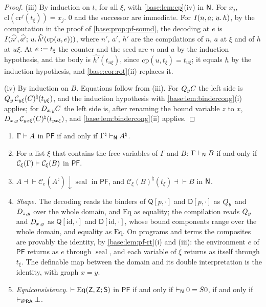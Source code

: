 \begin{proof}
(iii) By induction on $t$, for all $\xi$, with \cref{base:lem:cp}(iv) in
$\mathsf{N}$.  For $x_j$, $\mathrm{cl}(\mathrm{cr}^{j}(t_\xi))=x_j$.  $0$ and the
successor are immediate.  For $I(n,a;\,u.\,h)$, by the computation in the
proof of \cref{base:prop:pf-sound}, the decoding at $e$ is
$I(\widehat{n'},\widehat{a'};\,u.\,\widehat{h'}(\mathrm{cp}(u,e)))$, where
$n'$, $a'$, $h'$ are the compilations of $n$, $a$ at $\xi$ and of $h$ at
$u\xi$.  At $e\mathrel{:=} t_\xi$ the counter and the seed are $n$ and $a$ by the
induction hypothesis, and the body is
$\widehat{h'}(t_{u\xi})$, since $\mathrm{cp}(u,t_\xi)=t_{u\xi}$; it equals
$h$ by the induction hypothesis, and \cref{base:cor:rot}(ii) replaces it.

(iv) By induction on $B$.  Equations follow from (iii).  For $Q_{y}C$ the
left side is $Q_{y}\,\mathcal C_{y\xi}(C)^\natural(t_{y\xi})$, and the
induction hypothesis with \cref{base:lem:bindercong}(i) applies; for
$D_{x,y}C$ the left side is, after renaming the bound variable $z$ to $x$,
$D_{x,y}\,\mathcal C_{yx\xi}(C)^\natural(t_{yx\xi})$, and
\cref{base:lem:bindercong}(ii) applies.
\end{proof}

\begin{theorem}
\label{base:thm:pf}
\begin{enumerate}[label=\textup{(\roman*)}]
\item $\Gamma\vdash A$ in $\mathsf{PF}$ if and only if
 $\Gamma^\natural\vdash_{\mathsf{N}}A^\natural$.
\item For a list $\xi$ that contains the free variables of $\Gamma$ and
 $B$: $\Gamma\vdash_{\mathsf{N}}B$ if and only if
 $\mathcal C_\xi(\Gamma)\vdash\mathcal C_\xi(B)$ in $\mathsf{PF}$.
\item $A\dashv\vdash\mathcal C_e(A^\natural){\downarrow}\operatorname{seal}$
 in $\mathsf{PF}$, and $\mathcal C_\xi(B)^\natural(t_\xi)\dashv\vdash B$ in
 $\mathsf{N}$.
\item \emph{Shape.}  The decoding reads the binders of $\mathsf Q[p,\cdot]$
 and $\mathsf D[p,\cdot]$ as $Q_{y}$ and $D_{z,y}$ over the whole domain,
 and $\mathrm{Eq}$ as equality; the compilation reads $Q_{y}$ and
 $D_{x,y}$ as $\mathsf Q[\mathrm{id},\cdot]$ and $\mathsf D[\mathrm{id},\cdot]$,
 whose bound components range over the whole domain, and equality as
 $\mathrm{Eq}$.  On programs and terms the composites are provably the
 identity, by \cref{base:lem:pf-rt}(i) and (iii): the environment $e$ of
 $\mathsf{PF}$ returns as $e$ through $\operatorname{seal}$, and each
 variable of $\xi$ returns as itself through $t_\xi$.  The definable map
 between the domain and its double interpretation is the identity, with
 graph $x=y$.
\item \emph{Equiconsistency.}
 $\vdash\mathrm{Eq}(\mathsf Z,\mathsf Z;\mathsf S)$ in $\mathsf{PF}$ if and
 only if $\vdash_{\mathsf{N}}0=S 0$, if and only if $\vdash_{\mathsf{iPRA}}\bot$.
\end{enumerate}
\end{theorem}

